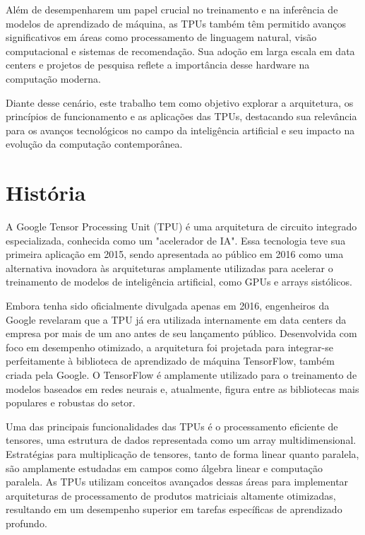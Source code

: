 \documentclass{report}
\begin{document}
Além de desempenharem um papel crucial no treinamento e na inferência de modelos de aprendizado de máquina, as TPUs também têm permitido avanços significativos em áreas como processamento de linguagem natural, visão computacional e sistemas de recomendação. Sua adoção em larga escala em data centers e projetos de pesquisa reflete a importância desse hardware na computação moderna.

Diante desse cenário, este trabalho tem como objetivo explorar a arquitetura, os princípios de funcionamento e as aplicações das TPUs, destacando sua relevância para os avanços tecnológicos no campo da inteligência artificial e seu impacto na evolução da computação contemporânea.

\chapter{História}

A Google Tensor Processing Unit (TPU) é uma arquitetura de circuito integrado especializada, conhecida como um "acelerador de IA". Essa tecnologia teve sua primeira aplicação em 2015, sendo apresentada ao público em 2016 como uma alternativa inovadora às arquiteturas amplamente utilizadas para acelerar o treinamento de modelos de inteligência artificial, como GPUs e arrays sistólicos.

Embora tenha sido oficialmente divulgada apenas em 2016, engenheiros da Google revelaram que a TPU já era utilizada internamente em data centers da empresa por mais de um ano antes de seu lançamento público. Desenvolvida com foco em desempenho otimizado, a arquitetura foi projetada para integrar-se perfeitamente à biblioteca de aprendizado de máquina TensorFlow, também criada pela Google. O TensorFlow é amplamente utilizado para o treinamento de modelos baseados em redes neurais e, atualmente, figura entre as bibliotecas mais populares e robustas do setor.

Uma das principais funcionalidades das TPUs é o processamento eficiente de tensores, uma estrutura de dados representada como um array multidimensional. Estratégias para multiplicação de tensores, tanto de forma linear quanto paralela, são amplamente estudadas em campos como álgebra linear e computação paralela. As TPUs utilizam conceitos avançados dessas áreas para implementar arquiteturas de processamento de produtos matriciais altamente otimizadas, resultando em um desempenho superior em tarefas específicas de aprendizado profundo.
\end{document}
